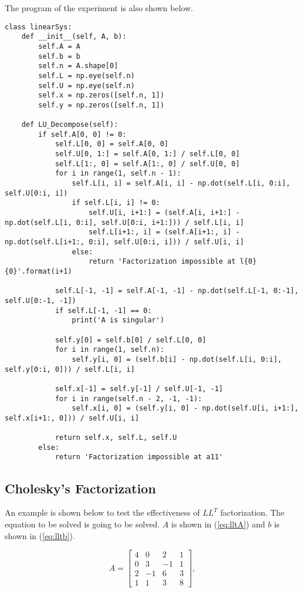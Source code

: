 \documentclass[preprint,12pt]{elsarticle}
\begin{document}
The program of the experiment is also shown below.
\begin{lstlisting}
class linearSys:
    def __init__(self, A, b):
        self.A = A
        self.b = b
        self.n = A.shape[0]
        self.L = np.eye(self.n)
        self.U = np.eye(self.n)
        self.x = np.zeros([self.n, 1])
        self.y = np.zeros([self.n, 1])
  
    def LU_Decompose(self):
        if self.A[0, 0] != 0:
            self.L[0, 0] = self.A[0, 0]
            self.U[0, 1:] = self.A[0, 1:] / self.L[0, 0]
            self.L[1:, 0] = self.A[1:, 0] / self.U[0, 0]
            for i in range(1, self.n - 1):
                self.L[i, i] = self.A[i, i] - np.dot(self.L[i, 0:i], self.U[0:i, i])
                if self.L[i, i] != 0:
                    self.U[i, i+1:] = (self.A[i, i+1:] - np.dot(self.L[i, 0:i], self.U[0:i, i+1:])) / self.L[i, i]
                    self.L[i+1:, i] = (self.A[i+1:, i] - np.dot(self.L[i+1:, 0:i], self.U[0:i, i])) / self.U[i, i]
                else:
                    return 'Factorization impossible at l{0}{0}'.format(i+1)
          
            self.L[-1, -1] = self.A[-1, -1] - np.dot(self.L[-1, 0:-1], self.U[0:-1, -1])
            if self.L[-1, -1] == 0:
                print('A is singular')
            
            self.y[0] = self.b[0] / self.L[0, 0]
            for i in range(1, self.n):
                self.y[i, 0] = (self.b[i] - np.dot(self.L[i, 0:i], self.y[0:i, 0])) / self.L[i, i]
            
            self.x[-1] = self.y[-1] / self.U[-1, -1]
            for i in range(self.n - 2, -1, -1):
                self.x[i, 0] = (self.y[i, 0] - np.dot(self.U[i, i+1:], self.x[i+1:, 0])) / self.U[i, i]
            
            return self.x, self.L, self.U
        else:
            return 'Factorization impossible at a11'
\end{lstlisting}

\subsection{Cholesky's Factorization}
\label{SS:3.2}

An example is shown below to test the effectiveness of $LL^T$ factorization. The equation to be solved is going to be solved. $A$ is shown in (\ref{eq:lltA}) and $b$ is shown in (\ref{eq:lltb}).

\begin{equation}
\label{eq:lltA}
  A = 
  \begin{bmatrix}
    4 & 0 & 2 & 1 \\
    0 & 3 & -1 & 1 \\
    2 & -1 & 6 & 3 \\
    1 & 1 & 3 & 8
  \end{bmatrix},
\end{equation}
\end{document}
